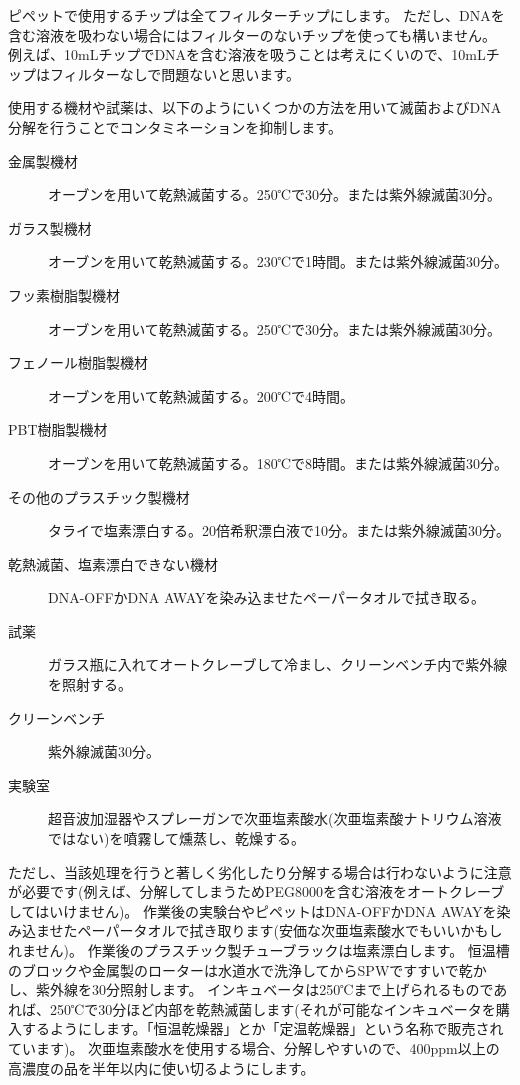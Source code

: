 \documentclass[titlepage,10pt,a4paper,uplatex]{jsbook}
\begin{document}
ピペットで使用するチップは全てフィルターチップにします。
ただし、DNAを含む溶液を吸わない場合にはフィルターのないチップを使っても構いません。
例えば、10mLチップでDNAを含む溶液を吸うことは考えにくいので、10mLチップはフィルターなしで問題ないと思います。

使用する機材や試薬は、以下のようにいくつかの方法を用いて滅菌およびDNA分解を行うことでコンタミネーションを抑制します。

\begin{description}
\item[金属製機材] オーブンを用いて乾熱滅菌する。250℃で30分。または紫外線滅菌30分。
\item[ガラス製機材] オーブンを用いて乾熱滅菌する。230℃で1時間。または紫外線滅菌30分。
\item[フッ素樹脂製機材] オーブンを用いて乾熱滅菌する。250℃で30分。または紫外線滅菌30分。
\item[フェノール樹脂製機材] オーブンを用いて乾熱滅菌する。200℃で4時間。
\item[PBT樹脂製機材] オーブンを用いて乾熱滅菌する。180℃で8時間。または紫外線滅菌30分。
\item[その他のプラスチック製機材] タライで塩素漂白する。20倍希釈漂白液で10分。または紫外線滅菌30分。
\item[乾熱滅菌、塩素漂白できない機材] DNA-OFFかDNA AWAYを染み込ませたペーパータオルで拭き取る。
\item[試薬] ガラス瓶に入れてオートクレーブして冷まし、クリーンベンチ内で紫外線を照射する。
\item[クリーンベンチ] 紫外線滅菌30分。
\item[実験室] 超音波加湿器やスプレーガンで次亜塩素酸水(次亜塩素酸ナトリウム溶液ではない)を噴霧して燻蒸し、乾燥する。
\end{description}

ただし、当該処理を行うと著しく劣化したり分解する場合は行わないように注意が必要です(例えば、分解してしまうためPEG8000を含む溶液をオートクレーブしてはいけません)。
作業後の実験台やピペットはDNA-OFFかDNA AWAYを染み込ませたペーパータオルで拭き取ります(安価な次亜塩素酸水でもいいかもしれません)。
作業後のプラスチック製チューブラックは塩素漂白します。
恒温槽のブロックや金属製のローターは水道水で洗浄してからSPWですすいで乾かし、紫外線を30分照射します。
インキュベータは250℃まで上げられるものであれば、250℃で30分ほど内部を乾熱滅菌します(それが可能なインキュベータを購入するようにします。「恒温乾燥器」とか「定温乾燥器」という名称で販売されています)。
次亜塩素酸水を使用する場合、分解しやすいので、400ppm以上の高濃度の品を半年以内に使い切るようにします。
\end{document}
